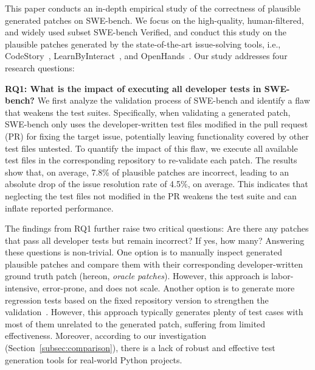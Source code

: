 This paper conducts an in-depth empirical study of the correctness of plausible generated patches on SWE-bench.
We focus on the high-quality, human-filtered, and widely used subset SWE-bench Verified, and conduct this study on the plausible patches generated by the state-of-the-art issue-solving tools, i.e., CodeStory~\cite{codestory}, LearnByInteract~\cite{su2025learn}, and OpenHands~\cite{wang2024openhands}.
Our study addresses four research questions:

\noindent \textbf{RQ1: What is the impact of executing all developer tests in SWE-bench?}
We first analyze the validation process of SWE-bench and identify a flaw that weakens the test suites.
Specifically, when validating a generated patch, SWE-bench only uses the developer-written test files modified in the pull request (PR) for fixing the target issue, potentially leaving functionality covered by other test files untested. 
To quantify the impact of this flaw,
we execute all available test files in the corresponding repository to re-validate each patch.
The results show that, on average, 7.8\% of plausible patches are incorrect, leading to an absolute drop of the issue resolution rate of 4.5\%, on average. 
This indicates that neglecting the test files not modified in the PR weakens the test suite and can inflate reported performance. 

%

The findings from RQ1 further raise two critical questions:
Are there any patches that pass all developer tests but remain incorrect? 
If yes, how many?
Answering these questions is non-trivial.
One option is to manually inspect generated plausible patches and compare them with their corresponding developer-written ground truth patch (hereon, \emph{oracle patches}).
However, this approach is labor-intensive, error-prone, and does not scale.
Another option is to generate more regression tests based on the fixed repository version to strengthen the validation~\cite{xin2017identifying,yu2019alleviating}.
However, this approach typically generates plenty of test cases with most of them unrelated to the generated patch, suffering from limited effectiveness.
Moreover, according to our investigation (Section~\ref{subsec:comparison}), there is a lack of robust and effective test generation tools for real-world Python projects.

